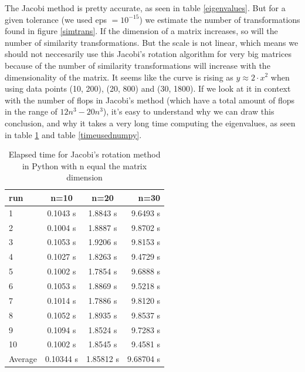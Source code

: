 \documentclass{article}
\begin{document}
The Jacobi method is pretty accurate, as seen in table \ref{eigenvalues}. But
for a given tolerance (we used eps $=10^{-15}$) we estimate the number of transformations found in figure \ref{simtrans}. If the dimension of a matrix increases, so will the number of similarity transformations.
But the scale is not linear, which means we should not neccesarily use this Jacobi's rotation algorithm for very big matrices because of the number of similarity transformations will increase with the dimensionality of the matrix. It seems like the curve is rising as $y \approx 2\cdot x^2$ when using data points (10, 200), (20, 800) and (30, 1800).
If we look at it in context with the number of flops in Jacobi's method (which have a total amount of flops in the range of $12n^3 - 20n^3$), it's easy to understand why we can draw this conclusion, and why it takes a very long time computing the eigenvalues, as seen in table \ref{timeusedjacobi} and table \ref{timeusednumpy}.


\begin{table}[H]
    \centering
    \begin{tabular}{|l|c|c|r|}
    \hline
     run & n=10 & n=20 & n=30\\
     \hline
      1  & 0.1043 s & 1.8843 s & 9.6493 s\\
      2  & 0.1004 s & 1.8887 s & 9.8702 s\\
      3  & 0.1053 s & 1.9206 s & 9.8153 s\\
      4  & 0.1027 s & 1.8263 s & 9.4729 s\\
      5  & 0.1002 s & 1.7854 s & 9.6888 s\\
      6  & 0.1053 s & 1.8869 s & 9.5218 s\\
      7  & 0.1014 s & 1.7886 s & 9.8120 s\\
      8  & 0.1052 s & 1.8935 s & 9.8537 s\\
      9  & 0.1094 s & 1.8524 s & 9.7283 s\\
      10 & 0.1002 s & 1.8545 s & 9.4581 s\\
      \hline
      Average & 0.10344 s & 1.85812  s & 9.68704 s\\
      \hline
    \end{tabular}
    \caption{Elapsed time for Jacobi's rotation method in Python with n equal the matrix dimension}
    \label{timeusedjacobi}
\end{table}
\end{document}
